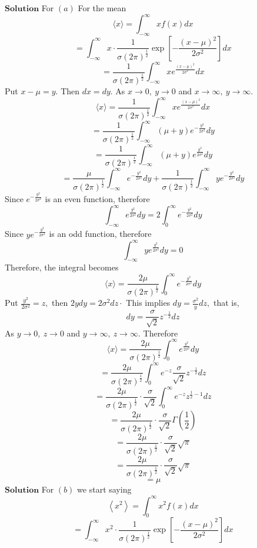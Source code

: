 $\boxed{\textbf{Solution}}$ For $(a)$ For the mean
$$
\langle x\rangle=\int_{-\infty}^{\infty} x f(x) d x
$$
$$
=\int_{-\infty}^{\infty} x \cdot \frac{1}{\sigma(2 \pi)^{\frac{1}{2}}} \exp \left[-\frac{(x-\mu)^{2}}{2 \sigma^{2}}\right] d x
$$
$$
=\frac{1}{\sigma(2 \pi)^{\frac{1}{2}}} \int_{-\infty}^{\infty} x e^{\frac{(x-\mu)^{2}}{2 \sigma^{2}}} d x
$$
Put $x-\mu=y .$ Then $d x=d y .$ As $x \rightarrow 0, \  y \rightarrow 0$ and $x \rightarrow \infty, \  y \rightarrow \infty$.
$$
\langle x\rangle=\frac{1}{\sigma(2 \pi)^{\frac{1}{2}}} \int_{-\infty}^{\infty} x e^{\frac{(x-\mu)^{2}}{2 \sigma^{2}}} d x
$$
$$
=\frac{1}{\sigma(2 \pi)^{\frac{1}{2}}} \int_{-\infty}^{\infty}(\mu+y) e^{-\frac{y^{2}}{2 \sigma^{2}}} d y
$$
$$
=\frac{1}{\sigma(2 \pi)^{\frac{1}{2}}} \int_{-\infty}^{\infty}(\mu+y) e^{\frac{y^{2}}{2 \sigma^{2}}} d y
$$
$$
=\frac{\mu}{\sigma(2 \pi)^{\frac{1}{2}}} \int_{-\infty}^{\infty} e^{-\frac{y^{2}}{2 \sigma^{2}}} d y+\frac{1}{\sigma(2 \pi)^{\frac{1}{2}}} \int_{-\infty}^{\infty} y e^{-\frac{y^{2}}{2 \sigma^{2}}} d y
$$
Since $e^{-\frac{y^{2}}{2 \sigma^{2}}}$ is an even function, therefore 
$$\int_{-\infty}^{\infty} e^{\frac{y^{2}}{2 \sigma^{2}}} d y=2 \int_{0}^{\infty} e^{-\frac{y^{2}}{2 \sigma^{2}}} d y$$
Since $y e^{-\frac{y^{2}}{2 \sigma^{2}}}$ is an odd
function, therefore 
$$\int_{-\infty}^{\infty} y e^{\frac{y^{2}}{2 \sigma^{2}}} d y=0$$
Therefore, the integral becomes
$$
\langle x\rangle=\frac{2 \mu}{\sigma(2 \pi)^{\frac{1}{2}}} \int_{0}^{\infty} e^{-\frac{y^{2}}{2 \sigma^{2}}} d y
$$
Put $\frac{y^{2}}{2 \sigma^{2}}=z,$ then $2 y d y=2 \sigma^{2} d z \cdot$ This implies $d y=\frac{\sigma^{2}}{y} d z,$ that is, 
$$d y=\frac{\sigma}{\sqrt{2}} z^{-\frac{1}{2}} d z$$
As $y \rightarrow 0, \  z \rightarrow 0$ and $y \rightarrow \infty, \  z \rightarrow \infty$. Therefore
$$\langle x\rangle=\frac{2 \mu}{\sigma(2 \pi)^{\frac{1}{2}}} \int_{0}^{\infty} e^{\frac{y^{2}}{2 \sigma^{2}}} d y$$
$$=\frac{2 \mu}{\sigma(2 \pi)^{\frac{1}{2}}} \int_{0}^{\infty} e^{-z} \frac{\sigma}{\sqrt{2}} z^{-\frac{1}{2}} d z$$
$$=\frac{2 \mu}{\sigma(2 \pi)^{\frac{1}{2}}} \cdot \frac{\sigma}{\sqrt{2}} \int_{0}^{\infty} e^{-z} z^{\frac{1}{2}-1} d z$$
$$=\frac{2 \mu}{\sigma(2 \pi)^{\frac{1}{2}}} \cdot \frac{\sigma}{\sqrt{2}} \Gamma\left(\frac{1}{2}\right)$$
$$=\frac{2 \mu}{\sigma(2 \pi)^{\frac{1}{2}}} \cdot \frac{\sigma}{\sqrt{2}} \sqrt{\pi}$$
$$=\frac{2 \mu}{\sigma(2 \pi)^{\frac{1}{2}}} \cdot \frac{\sigma}{\sqrt{2}} \sqrt{\pi}$$
$$=\mu$$
$\boxed{\textbf{Solution}}$ For $(b)$ we start saying
$$
\left\langle x^{2}\right\rangle=\int_{0}^{\infty} x^{2} f(x) d x
$$
$$
=\int_{-\infty}^{\infty} x^{2} \cdot \frac{1}{\sigma(2 \pi)^{\frac{1}{2}}} \exp \left[-\frac{(x-\mu)^{2}}{2 \sigma^{2}}\right] d x
$$
